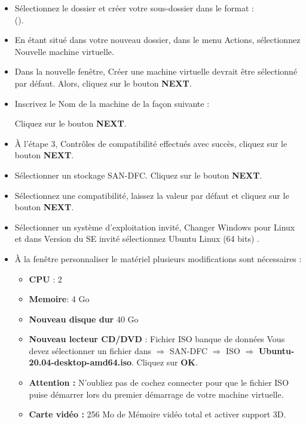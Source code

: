 	
	\begin{itemize}
		\item  Sélectionnez le dossier {\color{blue}\DossierVM }  et créer votre sous-dossier dans le format :\\
		 ({\color{orange}\sousDossierVM}). 
		 \item En étant situé dans votre nouveau dossier, dans le menu Actions, sélectionnez {\color{blue}Nouvelle machine virtuelle}. 
				
		\item Dans la nouvelle fenêtre, {\color{blue}Créer une machine virtuelle} devrait être sélectionné par défaut. Alors, cliquez sur le bouton \textbf{NEXT}.
		
		\item Inscrivez le Nom de la machine de la façon suivante : {\color{orange}\nomVM}
		
		Cliquez sur le bouton \textbf{NEXT}.
		
		\item À l'étape 3, Contrôles de compatibilité effectués avec succès, cliquez sur le bouton \textbf{NEXT}.
		
		\item Sélectionner un stockage {\color{blue}SAN-DFC}. Cliquez sur le bouton \textbf{NEXT}.
			
		\item Sélectionnez une compatibilité, laissez la valeur par défaut et cliquez sur le bouton \textbf{NEXT}. 
	
		
		\item Sélectionner un système d'exploitation invité, Changer {\color{blue} Windows pour Linux} et dans Version du SE invité sélectionnez {\color{blue}Ubuntu Linux (64 bits) }.
		
		
		\item À la fenêtre {\color{blue}personnaliser le matériel} plusieurs modifications sont nécessaires : 
		\begin{itemize}
			\item \textbf{CPU} : 2
			\item \textbf{Memoire}: 4 Go
			\item \textbf{Nouveau disque dur} 40 Go
			\item \textbf{Nouveau lecteur CD/DVD} : Fichier ISO banque de données
			Vous devez sélectionner un fichier dans \(\Rightarrow\)  SAN-DFC \(\Rightarrow\)  ISO \(\Rightarrow\) \textbf{Ubuntu-20.04-desktop-amd64.iso}. Cliquez sur \textbf{OK}.
			\item \textbf{Attention : } N'oubliez pas de cochez connecter pour que le fichier ISO puise démarrer lors du premier démarrage de votre machine virtuelle.
			\item \textbf{Carte vidéo :} 256 Mo de Mémoire vidéo total et activer support 3D.
		\end{itemize}
		

\end{itemize}
